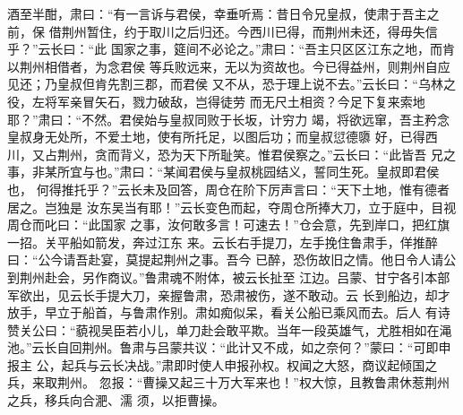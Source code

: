 酒至半酣，肃曰：“有一言诉与君侯，幸垂听焉：昔日令兄皇叔，使肃于吾主之前，保
借荆州暂住，约于取川之后归还。今西川已得，而荆州未还，得毋失信乎？”云长曰：“此
国家之事，筵间不必论之。”肃曰：“吾主只区区江东之地，而肯以荆州相借者，为念君侯
等兵败远来，无以为资故也。今已得益州，则荆州自应见还；乃皇叔但肯先割三郡，而君侯
又不从，恐于理上说不去。”云长曰：“乌林之役，左将军亲冒矢石，戮力破敌，岂得徒劳
而无尺土相资？今足下复来索地耶？”肃曰：“不然。君侯始与皇叔同败于长坂，计穷力
竭，将欲远窜，吾主矜念皇叔身无处所，不爱土地，使有所托足，以图后功；而皇叔愆德隳
好，已得西川，又占荆州，贪而背义，恐为天下所耻笑。惟君侯察之。”云长曰：“此皆吾
兄之事，非某所宜与也。”肃曰：“某闻君侯与皇叔桃园结义，誓同生死。皇叔即君侯也，
何得推托乎？”云长未及回答，周仓在阶下厉声言曰：“天下土地，惟有德者居之。岂独是
汝东吴当有耶！”云长变色而起，夺周仓所捧大刀，立于庭中，目视周仓而叱曰：“此国家
之事，汝何敢多言！可速去！”仓会意，先到岸口，把红旗一招。关平船如箭发，奔过江东
来。云长右手提刀，左手挽住鲁肃手，佯推醉曰：“公今请吾赴宴，莫提起荆州之事。吾今
已醉，恐伤故旧之情。他日令人请公到荆州赴会，另作商议。”鲁肃魂不附体，被云长扯至
江边。吕蒙、甘宁各引本部军欲出，见云长手提大刀，亲握鲁肃，恐肃被伤，遂不敢动。云
长到船边，却才放手，早立于船首，与鲁肃作别。肃如痴似呆，看关公船已乘风而去。后人
有诗赞关公曰：“藐视吴臣若小儿，单刀赴会敢平欺。当年一段英雄气，尤胜相如在渑
池。”云长自回荆州。鲁肃与吕蒙共议：“此计又不成，如之奈何？”蒙曰：“可即申报主
公，起兵与云长决战。”肃即时使人申报孙权。权闻之大怒，商议起倾国之兵，来取荆州。
忽报：“曹操又起三十万大军来也！”权大惊，且教鲁肃休惹荆州之兵，移兵向合淝、濡
须，以拒曹操。


